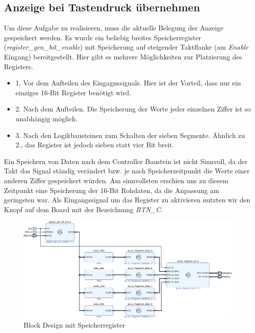 \documentclass[11pt, a4paper]{article}
\begin{document}
\subsection*{Anzeige bei Tastendruck übernehmen}
Um diese Aufgabe zu realisieren, muss die aktuelle Belegung der Anzeige gespeichert werden. Es wurde ein beliebig breites Speicherregister (\textit{register\_gen\_bit\_enable}) mit Speicherung auf steigender Taktflanke (am \textit{Enable} Eingang) bereitgestellt. Hier gibt es mehrere Möglichkeiten zur Platzierung des Registers.
\begin{itemize}
	\item 1. Vor dem Aufteilen des Eingagnssignals. Hier ist der Vorteil, dass nur ein einziges 16-Bit Register benötigt wird.
	\item 2. Nach dem Aufteilen. Die Speicherung der Werte jeder einzelnen Ziffer ist so unabhängig möglich.
	\item 3. Nach den Logikbausteinen zum Schalten der sieben Segmente. Ähnlich zu 2., das Register ist jedoch sieben statt vier Bit breit.
\end{itemize}
Ein Speichern von Daten nach dem Controller Baustein ist nicht Sinnvoll, da der Takt das Signal ständig verändert bzw. je nach Speicherzeitpunkt die Werte einer anderen Ziffer gespeichert würden.
Am sinnvollsten erschien uns zu diesem Zeitpunkt eine Speicherung der 16-Bit Rohdaten, da die Anpassung am geringsten war. Als Eingangssignal um das Register zu aktivieren nutzten wir den Knopf auf dem Board mit der Bezeichnung \textit{BTN\_C}.
\begin{figure}[htb]    
    \centering
    \includegraphics[width=\linewidth]{versuch4Data/hierarchical_display_trigger.pdf}
    \caption{Block Design mit Speicherregister}
    \label{aufbauTrigger}        
\end{figure}
\end{document}
